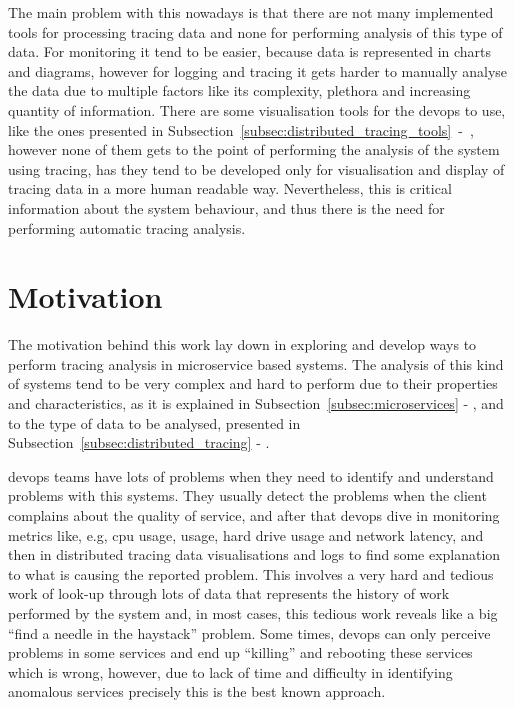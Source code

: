 The main problem with this nowadays is that there are not many implemented tools for processing tracing data and none for performing analysis of this type of data. For monitoring it tend to be easier, because data is represented in charts and diagrams, however for logging and tracing it gets harder to manually analyse the data due to multiple factors like its complexity, plethora and increasing quantity of information. There are some visualisation tools for the \gls{devops} to use, like the ones presented in Subsection~\ref{subsec:distributed_tracing_tools}~-~, however none of them gets to the point of performing the analysis of the system using tracing, has they tend to be developed only for visualisation and display of tracing data in a more human readable way. Nevertheless, this is critical information about the system behaviour, and thus there is the need for performing automatic tracing analysis.

\section{Motivation}
\label{sec:motivation}

The motivation behind this work lay down in exploring and develop ways to perform tracing analysis in microservice based systems. The analysis of this kind of systems tend to be very complex and hard to perform due to their properties and characteristics, as it is explained in Subsection~\ref{subsec:microservices} - , and to the type of data to be analysed, presented in Subsection~\ref{subsec:distributed_tracing} - .

\gls{devops} teams have lots of problems when they need to identify and understand problems with this systems. They usually detect the problems when the client complains about the quality of service, and after that \gls{devops} dive in monitoring metrics like, e.g, \gls{cpu} usage, usage, hard drive usage and network latency, and then in distributed tracing data visualisations and logs to find some explanation to what is causing the reported problem. This involves a very hard and tedious work of look-up through lots of data that represents the history of work performed by the system and, in most cases, this tedious work reveals like a big ``find a needle in the haystack'' problem. Some times, \gls{devops} can only perceive problems in some services and end up ``killing'' and rebooting these services which is wrong, however, due to lack of time and difficulty in identifying anomalous services precisely this is the best known approach.

